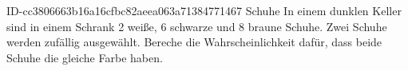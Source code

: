 \begin{exercise}
      {ID-cc3806663b16a16cfbc82aeea063a71384771467}
      {Schuhe}
  \ifproblem\problem
    In einem dunklen Keller sind in einem Schrank 2 weiße, 6 schwarze und 8
    braune Schuhe. Zwei Schuhe werden zufällig ausgewählt. Bereche die
    Wahrscheinlichkeit dafür, dass beide Schuhe die gleiche Farbe haben.
  \fi
\end{exercise}
